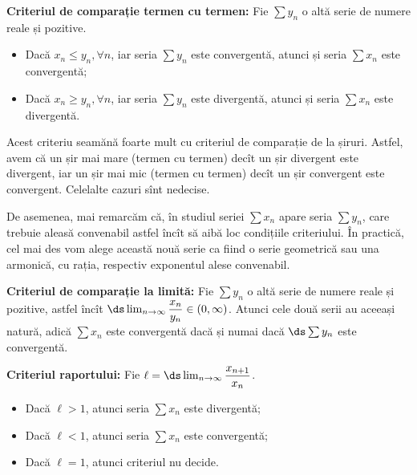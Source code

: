 \textbf{Criteriul de comparație termen cu termen:} Fie $ \sum y_n $ o altă serie
de numere reale și pozitive.
\begin{itemize}
    \item Dacă $ x_n \leq y_n, \forall n $, iar seria $ \sum y_n $ este convergentă,
        atunci și seria $ \sum x_n $ este convergentă;
    \item Dacă $ x_n \geq y_n, \forall n $, iar seria $ \sum y_n $ este divergentă,
        atunci și seria $ \sum x_n $ este divergentă.
\end{itemize}

Acest criteriu seamănă foarte mult cu criteriul de comparație de la șiruri.
Astfel, avem că un șir mai mare (termen cu termen) decît un șir divergent este
divergent, iar un șir mai mic (termen cu termen) decît un șir convergent este
convergent. Celelalte cazuri sînt nedecise.

De asemenea, mai remarcăm că, în studiul seriei $ \sum x_n $ apare seria $ \sum y_n $,
care trebuie aleasă convenabil astfel încît să aibă loc condițiile criteriului.
În practică, cel mai des vom alege această nouă serie ca fiind o serie geometrică
sau una armonică, cu rația, respectiv exponentul alese convenabil.

\vspace{1cm}

\textbf{Criteriul de comparație la limită:} Fie $ \sum y_n $ o altă serie de numere
reale și pozitive, astfel încît $ \ds\lim_{n \to \infty} \dfrac{x_n}{y_n} \in (0, \infty) $.
Atunci cele două serii au aceeași natură, adică $ \sum x_n $ este convergentă
dacă și numai dacă $ \ds\sum y_n $ este convergentă.

\vspace{1cm}

\textbf{Criteriul raportului:} Fie $ \ell = \ds\lim_{n \to \infty} \dfrac{x_{n+1}}{x_n} $.
\begin{itemize}
    \item Dacă $ \ell > 1 $, atunci seria $ \sum x_n $ este divergentă;
    \item Dacă $ \ell < 1 $, atunci seria $ \sum x_n $ este convergentă;
    \item Dacă $ \ell = 1 $, atunci criteriul nu decide.
\end{itemize}

\vspace{1cm}

